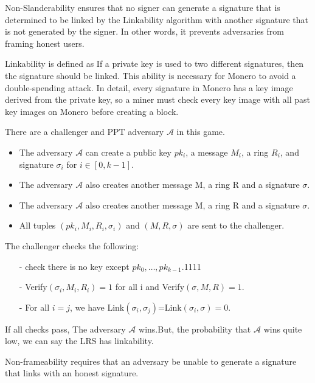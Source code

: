     Non-Slanderability ensures that no signer can generate a signature that is determined to be linked by the Linkability algorithm with another signature that is not generated by the signer. In other words, it prevents adversaries from framing honest users.
    
    
    Linkability is defined as If a private key is used to two different signatures, then the signature should be linked. This ability is necessary for Monero to avoid a double-spending attack. In detail, every signature in Monero has a key image derived from the private key, so a miner must check every key image with all past key images on Monero before creating a block.
    
    \begin{definition}[Linkability]  There are a challenger and PPT adversary $\mathcal A $ in this game.
    
    \begin{itemize}
        \item The adversary $\mathcal A $ can create a public key $pk_i$, a message $M_i$, a ring $R_i$, and signature $\sigma_i$ for $i \in [0,k-1]$.
        \item The adversary $\mathcal A $ also creates another message M, a ring R and a signature $\sigma$.
        \item The adversary $\mathcal A $ also creates another message M, a ring R and a signature $\sigma$.
        \item All tuples $(pk_i,M_i,R_i,\sigma_i)$ and $(M,R,\sigma)$ are sent to the challenger.
    \end{itemize}
    The challenger checks the following:
    \begin{itemize}
        \item[-] check there is no key except $pk_0,\ldots, pk_{k-1}$.1111
        \item[-] Verify$(\sigma_i,M_i,R_i)=1$ for all i and Verify$(\sigma,M,R)=1$.
        \item[-] For all $i=j$, we have Link$(\sigma_i,\sigma_j)$=Link$(\sigma_i,\sigma)=0$.
    \end{itemize}

    If all checks pass, The adversary $\mathcal A $ wins.But, the probability that $\mathcal A $ wins quite low, we can say the LRS has linkability.
    \end{definition}
    
    Non-frameability requires that an adversary be unable to generate a signature that links with an honest signature.
    
